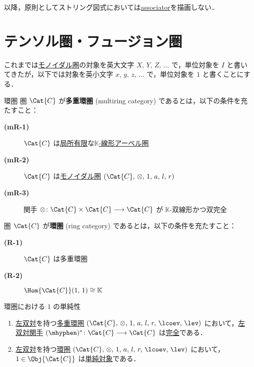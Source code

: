 \documentclass[TQFT_main]{subfiles}
\begin{document}
\begin{marker}
    以降，原則としてストリング図式においては\hyperref[redef:monoidal-category]{associator}を描画しない．
\end{marker}

\section{テンソル圏・フュージョン圏}

\begin{marker}
    これまでは\hyperref[redef:monoidal-category]{モノイダル圏}の対象を英大文字 $X,\, Y,\, Z,\, \dots$ で，単位対象を $I$ と書いてきたが，以下では対象を英小文字 $x,\, y,\, z,\, \dots$ で，単位対象を $1$ と書くことにする．
\end{marker}

\begin{mydef}[label=def:ringcat]{環圏}
    圏 $\Cat{C}$ が\textbf{多重環圏} (multiring category) であるとは，以下の条件を充たすこと：
    \begin{description}
        \item[\textbf{(mR-1)}] $\Cat{C}$ は\hyperref[def:finite-abcat]{局所有限}な\hyperref[def:additive-cat]{$\mathbb{K}$-線形アーベル圏}
        \item[\textbf{(mR-2)}] $\Cat{C}$ は\hyperref[redef:rigid]{モノイダル圏} $(\Cat{C},\, \otimes,\, 1,\, a,\, l,\, r)$
        \item[\textbf{(mR-3)}] 関手 $\otimes \colon \Cat{C} \times \Cat{C} \lto \Cat{C}$ が $\mathbb{K}$-双線形かつ双完全
    \end{description}
    圏 $\Cat{C}$ が\textbf{環圏} (ring category) であるとは，以下の条件を充たすこと：
    \begin{description}
        \item[\textbf{(R-1)}] $\Cat{C}$ は多重環圏
        \item[\textbf{(R-2)}] $\Hom{\Cat{C}} (1,\, 1) \cong \mathbb{K}$ 
    \end{description}
\end{mydef}

\begin{mylem}[label=lem:1-simple-ringcat]{環圏における $1$ の単純性}
    \begin{enumerate}
        \item \hyperref[redef:dual]{左双対}を持つ\hyperref[def:ringcat]{多重環圏} $(\Cat{C},\, \otimes,\, 1,\, a,\, l,\, r,\, \lcoev,\, \lev)$ において，\hyperref[lem:ldual-functor]{左双対関手} $(\mhyphen)^* \colon \Cat{C} \lto \Cat{C}$ は\hyperref[def:additive-exact]{完全}である．
        \item \hyperref[redef:dual]{左双対}を持つ\hyperref[def:ringcat]{環圏} $(\Cat{C},\, \otimes,\, 1,\, a,\, l,\, r,\, \lcoev,\, \lev)$ において，$1 \in \Obj{\Cat{C}}$ は\hyperref[def:semisimple-cat]{単純対象}である．
    \end{enumerate}
\end{mylem}
\end{document}
